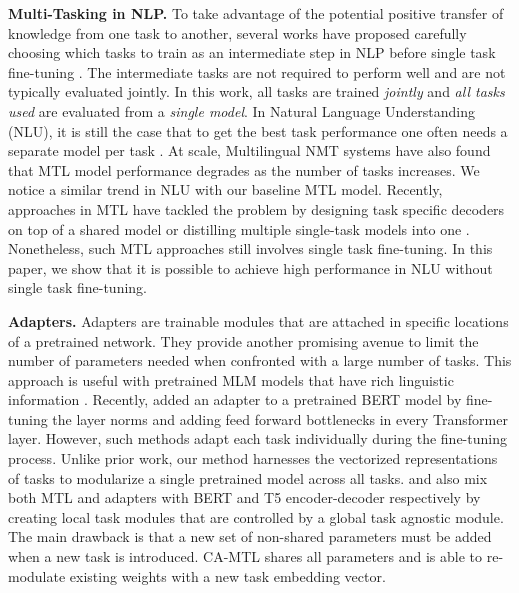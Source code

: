 \documentclass{article} \usepackage{iclr2021_conference,times}
\begin{document}
\textbf{Multi-Tasking in NLP.}
To take advantage of the potential positive transfer of knowledge from one task to another, several works have proposed carefully choosing which tasks to train as an intermediate step in NLP before single task fine-tuning \citep{bingel-sogaard-2017-identifying,kerinec-etal-2018-deep,wang-acl-19,DBLP:journals/corr/abs-1905-07553,pruksachatkun2020intermediate,DBLP:journals/corr/abs-1811-01088}. The intermediate tasks are not required to perform well and are not typically evaluated jointly. In this work, all tasks are trained \emph{jointly} and \emph{all tasks used} are evaluated from a \emph{single model}. In Natural Language Understanding (NLU), it is still the case that to get the best task performance one often needs a separate model per task \citep{mtl_bert_clark2019,mccann2018natural}.
At scale, Multilingual NMT systems \citep{aharoni-etal-2019-massively} have also found that MTL model performance degrades as the number of tasks increases. We notice a similar trend in NLU with our baseline MTL model.
Recently, approaches in MTL have tackled the problem by designing task specific decoders on top of a shared model \citep{mtl_bert_liu2019} or distilling multiple single-task models into one \citep{mtl_bert_clark2019}. Nonetheless, such MTL approaches still involves single task fine-tuning. In this paper, we show that it is possible to achieve high performance in NLU without single task fine-tuning. 



\textbf{Adapters.}
Adapters are  trainable modules that are attached in specific locations of a pretrained network. They provide another promising avenue to limit the number of parameters needed when confronted with a large number of tasks. This approach is useful with pretrained MLM models that have rich linguistic information  \citep{context_prob,bert_analysis,trans_context,bert_classicnlp}.  Recently, \citet{DBLP:journals/corr/abs-1902-00751} added an adapter to a pretrained BERT model by fine-tuning the layer norms and adding feed forward bottlenecks in every Transformer layer. 
However, such methods adapt each task individually during the fine-tuning process. Unlike prior work, our method harnesses the vectorized representations of tasks to modularize a single pretrained model across all tasks. \citet{pmlr-v97-stickland19a} and \citet{tay2020hypergrid} also mix both MTL and adapters with BERT and T5 encoder-decoder \citep{t5} respectively by creating local task modules that are controlled by a global task agnostic module. The main drawback is that a new set of non-shared parameters must be added when a new task is introduced. CA-MTL shares all parameters and is able to re-modulate existing weights with a new task embedding vector.
\end{document}
